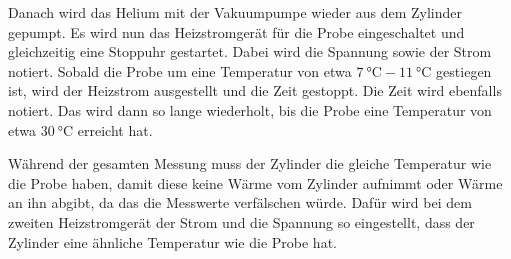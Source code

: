 Danach wird das Helium mit der Vakuumpumpe wieder aus dem Zylinder gepumpt. Es wird nun das Heizstromgerät für 
die Probe eingeschaltet und gleichzeitig eine Stoppuhr gestartet. Dabei wird die Spannung sowie der Strom notiert. 
Sobald die Probe um eine Temperatur von etwa $\SI{7}{\celsius}-\SI{11}{\celsius}$
gestiegen ist, wird der Heizstrom ausgestellt und die Zeit gestoppt. Die Zeit wird ebenfalls notiert. 
Das wird dann so lange wiederholt, bis die Probe eine Temperatur von etwa $\SI{30}{\celsius}$ 
erreicht hat. 

Während der gesamten Messung muss der Zylinder die gleiche Temperatur wie die Probe haben, damit 
diese keine Wärme vom Zylinder aufnimmt oder Wärme an ihn abgibt, da das die Messwerte verfälschen würde. 
Dafür wird bei dem zweiten Heizstromgerät der Strom und die Spannung so eingestellt, dass der Zylinder eine ähnliche Temperatur wie die Probe hat. 